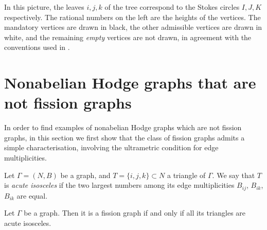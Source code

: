 \documentclass[11pt,a4paper]{amsart}
\numberwithin{equation}{section}
\begin{document}
\begin{example}
\begin{center}
\end{center}
In this picture, the leaves $i,j,k$ of the tree correspond to the Stokes circles $I,J,K$ respectively. The rational numbers on the left are the heights of the vertices. The mandatory vertices are drawn in black, the other admissible vertices are drawn in white, and the remaining \emph{empty} vertices are not drawn, in agreement with the conventions used in \cite{boalch2025twisted}.
\end{example}



\section{Nonabelian Hodge graphs that are not fission graphs}
\label{sec:untwisted_case}

In order to find examples of nonabelian Hodge graphs which are not fission graphs, in this section we first show that the class of fission graphs admits a simple characterisation, involving the ultrametric condition for edge multiplicities. 


\begin{definition}
Let $\Gamma=(N,B)$ be a graph, and $T=\{i,j,k\}\subset N$ a triangle of $\Gamma$. We say that $T$ is \emph{acute isosceles} if the two largest numbers among its edge multiplicities $B_{ij}$, $B_{ik}$, $B_{ik}$ are equal.
\end{definition}


\begin{theorem}\label{thm:characterisation_fission_graphs}
Let $\Gamma$ be a graph. Then it is a fission graph if and only if all its triangles are acute isosceles. 
\end{theorem}
\end{document}
